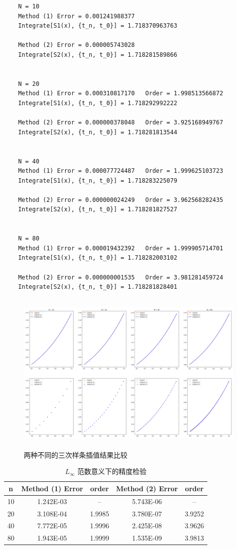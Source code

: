 \documentclass{ctexart}
\begin{document}
\begin{verbatim}
	N = 10
	Method (1) Error = 0.001241988377	
	Integrate[S1(x), {t_n, t_0}] = 1.718370963763
	
	Method (2) Error = 0.000005743028	
	Integrate[S2(x), {t_n, t_0}] = 1.718281589866
	
	
	N = 20
	Method (1) Error = 0.000310817170	Order = 1.998513566872
	Integrate[S1(x), {t_n, t_0}] = 1.718292992222
	
	Method (2) Error = 0.000000378048	Order = 3.925168949767
	Integrate[S2(x), {t_n, t_0}] = 1.718281813544
	
	
	N = 40
	Method (1) Error = 0.000077724487	Order = 1.999625103723
	Integrate[S1(x), {t_n, t_0}] = 1.718283225079
	
	Method (2) Error = 0.000000024249	Order = 3.962568282435
	Integrate[S2(x), {t_n, t_0}] = 1.718281827527
	
	
	N = 80
	Method (1) Error = 0.000019432392	Order = 1.999905714701
	Integrate[S1(x), {t_n, t_0}] = 1.718282003102
	
	Method (2) Error = 0.000000001535	Order = 3.981281459724
	Integrate[S2(x), {t_n, t_0}] = 1.718281828401
\end{verbatim}

\begin{figure}[H]
	\centering
	\includegraphics[width = 15cm, height = 8cm]{figure.png}
	\caption{两种不同的三次样条插值结果比较} \label{figure.label}
\end{figure}

\begin{table}[htb]
	\centering
	\bigskip
	\begin{small}
		\begin{tabular}{|c|cc|cc|}
			\hline
			n & Method (1) Error & order & Method (2) Error & order\\\hline
			10& 1.242E-03 & -- & 5.743E-06 & --\\
			20& 3.108E-04 & 1.9985 & 3.780E-07 & 3.9252 \\
			40& 7.772E-05 & 1.9996 & 2.425E-08 & 3.9626\\
			80& 1.943E-05 & 1.9999 & 1.535E-09 & 3.9813\\\hline
		\end{tabular}
	\end{small}
	\caption{\label{table.label} $L_\infty$ 范数意义下的精度检验} 
\end{table}
\end{document}
